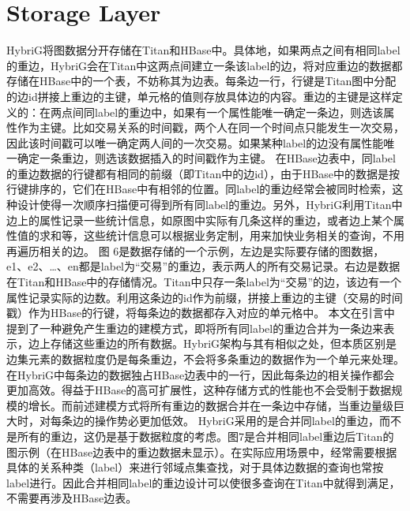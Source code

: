 
\chapter{Storage Layer}
HybriG将图数据分开存储在Titan和HBase中。具体地，如果两点之间有相同label的重边，HybriG会在Titan中这两点间建立一条该label的边，将对应重边的数据都存储在HBase中的一个表，不妨称其为边表。每条边一行，行键是Titan图中分配的边id拼接上重边的主键，单元格的值则存放具体边的内容。重边的主键是这样定义的：在两点间同label的重边中，如果有一个属性能唯一确定一条边，则选该属性作为主键。比如交易关系的时间戳，两个人在同一个时间点只能发生一次交易，因此该时间戳可以唯一确定两人间的一次交易。如果某种label的边没有属性能唯一确定一条重边，则选该数据插入的时间戳作为主键。
在HBase边表中，同label的重边数据的行键都有相同的前缀（即Titan中的边id），由于HBase中的数据是按行键排序的，它们在HBase中有相邻的位置。同label的重边经常会被同时检索，这种设计使得一次顺序扫描便可得到所有同label的重边。另外，HybriG利用Titan中边上的属性记录一些统计信息，如原图中实际有几条这样的重边，或者边上某个属性值的求和等，这些统计信息可以根据业务定制，用来加快业务相关的查询，不用再遍历相关的边。
图 6是数据存储的一个示例，左边是实际要存储的图数据， e1、e2、…、en都是label为“交易”的重边，表示两人的所有交易记录。右边是数据在Titan和HBase中的存储情况。Titan中只存一条label为“交易”的边，该边有一个属性记录实际的边数。利用这条边的id作为前缀，拼接上重边的主键（交易的时间戳）作为HBase的行键，将每条边的数据都存入对应的单元格中。
本文在引言中提到了一种避免产生重边的建模方式，即将所有同label的重边合并为一条边来表示，边上存储这些重边的所有数据。HybriG架构与其有相似之处，但本质区别是边集元素的数据粒度仍是每条重边，不会将多条重边的数据作为一个单元来处理。在HybriG中每条边的数据独占HBase边表中的一行，因此每条边的相关操作都会更加高效。得益于HBase的高可扩展性，这种存储方式的性能也不会受制于数据规模的增长。而前述建模方式将所有重边的数据合并在一条边中存储，当重边量级巨大时，对每条边的操作势必更加低效。
HybriG采用的是合并同label的重边，而不是所有的重边，这仍是基于数据粒度的考虑。图7是合并相同label重边后Titan的图示例（在HBase边表中的重边数据未显示）。在实际应用场景中，经常需要根据具体的关系种类（label）来进行邻域点集查找，对于具体边数据的查询也常按label进行。因此合并相同label的重边设计可以使很多查询在Titan中就得到满足，不需要再涉及HBase边表。


